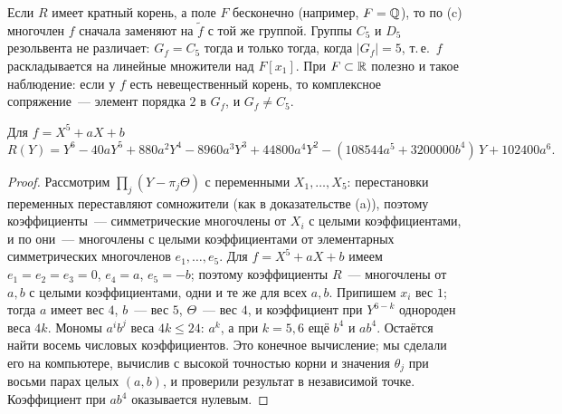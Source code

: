 Если $R$ имеет кратный корень, а поле $F$ бесконечно (например, $F=\mathbb Q$), то по (c) многочлен $f$ сначала заменяют на $\tilde f$ с той же группой.
Группы $C_5$ и $D_5$ резольвента не различает: $G_f=C_5$ тогда и только тогда, когда $|G_f|=5$, т.\,е.\ $f$ раскладывается
на линейные множители над $F[x_1]$. При $F\subset\mathbb R$ полезно и такое наблюдение: если у $f$ есть невещественный корень, то
комплексное сопряжение~--- элемент порядка $2$ в $G_f$, и $G_f\ne C_5$.

\begin{proposition}
Для $f=X^5+aX+b$
\[
R(Y)=Y^6-40aY^5+880a^2Y^4-8960a^3Y^3+44800a^4Y^2-(108544a^5+3200000b^4)\,Y+102400a^6 .
\]
\end{proposition}

\begin{proof}
Рассмотрим $\prod_j(Y-\pi_j\Theta)$ с переменными $X_1,\dots,X_5$: перестановки переменных переставляют сомножители
(как в доказательстве (a)), поэтому коэффициенты~--- симметрические многочлены от $X_i$ с целыми коэффициентами, и
по  они~--- многочлены с целыми коэффициентами от элементарных симметрических многочленов $e_1,\dots,e_5$. Для
$f=X^5+aX+b$ имеем $e_1=e_2=e_3=0$, $e_4=a$, $e_5=-b$; поэтому коэффициенты $R$~--- многочлены от $a,b$ с целыми
коэффициентами, одни и те же для всех $a,b$. Припишем $x_i$ вес $1$; тогда $a$ имеет вес $4$, $b$~--- вес $5$, $\Theta$~--- вес $4$, и коэффициент при $Y^{6-k}$
однороден веса $4k$. Мономы $a^ib^j$ веса $4k\le24$: $a^k$, а при $k=5,6$ ещё $b^4$ и $ab^4$. Остаётся найти восемь
числовых коэффициентов. Это конечное вычисление; мы сделали его на компьютере, вычислив с высокой точностью корни и
значения $\theta_j$ при восьми парах целых $(a,b)$, и проверили результат в независимой точке. Коэффициент при $ab^4$
оказывается нулевым.
\end{proof}

